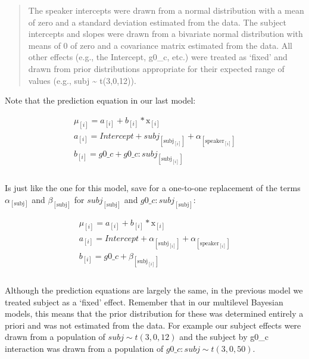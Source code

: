 \documentclass[
]{book}
\begin{document}
\begin{quote}
The speaker intercepts were drawn from a normal distribution with a mean of zero and a standard deviation estimated from the data. The subject intercepts and slopes were drawn from a bivariate normal distribution with means of 0 of zero and a covariance matrix estimated from the data. All other effects (e.g., the Intercept, g0\_c, etc.) were treated as `fixed' and drawn from prior distributions appropriate for their expected range of values (e.g., subj \textasciitilde{} t(3,0,12)).
\end{quote}

Note that the prediction equation in our last model:

\begin{equation}
\begin{split}
\mu_{[i]} = a_{[i]} + b_{[i]} * \mathrm{x}_{[i]}  \\ 
a_{[i]} = Intercept + subj_{[\mathrm{subj}_{[i]}]} + \alpha_{[\mathrm{speaker}_{[i]}]}  \\
b_{[i]} =  g0\_c + g0\_c \colon subj_{[\mathrm{subj}_{[i]}]} \\ \\
\end{split}
\label{eq:69}
\end{equation}

Is just like the one for this model, save for a one-to-one replacement of the terms \(\alpha_{[\mathrm{subj}]}\) and \(\beta_{[\mathrm{subj}]}\) for \(subj_{[\mathrm{subj}]}\) and \(g0\_c \colon subj_{[\mathrm{subj}]}\):

\begin{equation}
\begin{split}
\mu_{[i]} = a_{[i]} + b_{[i]} * \mathrm{x}_{[i]}  \\ 
a_{[i]} = Intercept + \alpha_{[\mathrm{subj}_{[i]}]} + \alpha_{[\mathrm{speaker}_{[i]}]}  \\
b_{[i]} =  g0\_c + \beta_{[\mathrm{subj}_{[i]}]} \\ \\
\end{split}
\label{eq:610}
\end{equation}

Although the prediction equations are largely the same, in the previous model we treated subject as a `fixed' effect. Remember that in our multilevel Bayesian models, this means that the prior distribution for these was determined entirely a priori and was not estimated from the data. For example our subject effects were drawn from a population of \(subj \sim t(3, 0, 12)\) and the subject by g0\_c interaction was drawn from a population of \(g0\_c \colon subj \sim t(3, 0, 50)\).
\end{document}
